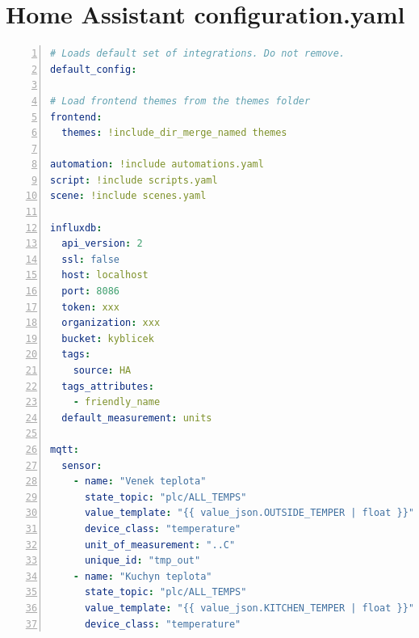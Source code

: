 \chapter{Home Assistant configuration.yaml}
\label{apend:configyaml}
\begin{lstlisting}[language=YAML, breaklines=true, numbers=left, numberstyle=\small, numbersep=10pt, frame=single, basicstyle=\ttfamily\small, caption={Home Assistant configuration.yaml}, label={lst:configyaml}]
# Loads default set of integrations. Do not remove.            
default_config:

# Load frontend themes from the themes folder                  
frontend:                                                      
  themes: !include_dir_merge_named themes

automation: !include automations.yaml
script: !include scripts.yaml                    
scene: !include scenes.yaml                                    

influxdb:
  api_version: 2           
  ssl: false
  host: localhost                                              
  port: 8086                                                   
  token: xxx
  organization: xxx                                
  bucket: kyblicek                                             
  tags:                                                        
    source: HA                                                 
  tags_attributes:                                              
    - friendly_name                                             
  default_measurement: units                                   

mqtt:
  sensor:
    - name: "Venek teplota"
      state_topic: "plc/ALL_TEMPS"
      value_template: "{{ value_json.OUTSIDE_TEMPER | float }}"
      device_class: "temperature"
      unit_of_measurement: "..C"
      unique_id: "tmp_out"
    - name: "Kuchyn teplota"
      state_topic: "plc/ALL_TEMPS"                             
      value_template: "{{ value_json.KITCHEN_TEMPER | float }}"
      device_class: "temperature"
\end{lstlisting}
\pagebreak

